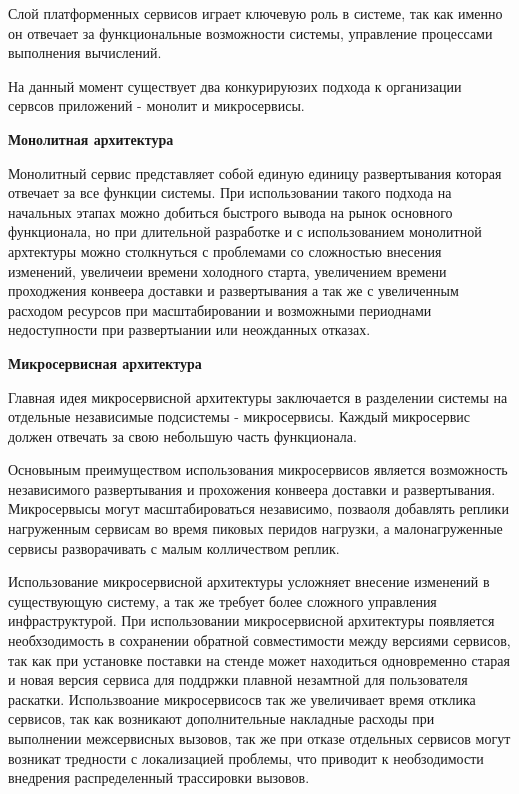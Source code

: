Слой платформенных сервисов играет ключевую роль в системе, так как именно он отвечает за функциональные возможности системы, управление процессами выполнения вычислений.

На данный момент существует два конкурируюзих подхода к организации сервсов приложений - монолит и микросервисы\cite{newman2019monolith}.

{\bf Монолитная архитектура}

Монолитный сервис представляет собой единую единицу развертывания которая отвечает за все функции системы. При использовании такого подхода на начальных этапах можно добиться быстрого вывода на рынок основного функционала, но при длительной разработке и с использованием монолитной архтектуры можно столкнуться с проблемами со сложностью внесения изменений, увеличеии времени холодного старта, увеличением времени проходжения конвеера доставки и развертывания а так же с увеличенным расходом ресурсов при масштабировании и возможными периоднами недоступности при развертыании или неожданных отказах.

{\bf Микросервисная архитектура}

Главная идея микросервисной архитектуры заключается в разделении системы на отдельные независимые подсистемы - микросервисы. Каждый микросервис должен отвечать за свою небольшую часть функционала.

Основыным преимуществом использования микросервисов является возможность независимого развертывания и прохожения конвеера доставки и развертывания. Микросервысы могут масштабироваться независимо, позваоля добавлять реплики нагруженным сервисам во время пиковых перидов нагрузки, а малонагруженные сервисы разворачивать с малым колличеством реплик.

Использование микросервисной архитектуры усложняет внесение изменений в существующую систему, а так же требует более сложного управления инфраструктурой.
При использовании микросервисной архитектуры появляется необхзодимость в сохранении обратной совместимости между версиями сервисов, так как при установке поставки на стенде может находиться одновременно старая и новая версия сервиса для поддржки плавной незамтной для пользователя раскатки.
Использвоание микросервисосв так же увеличивает время отклика сервисов, так как возникают дополнительные накладные расходы при выполнении межсервисных вызовов, так же при отказе отдельных сервисов могут возникат тредности с локализацией проблемы, что приводит к необзодимости внедрения распределенный трассировки вызовов.

